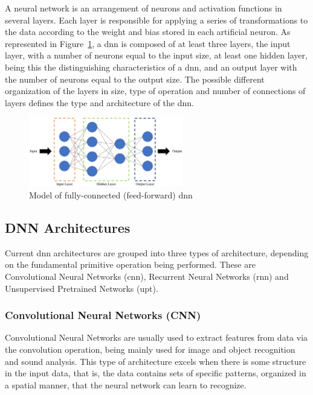 A neural network is an arrangement of neurons and activation functions in several layers. Each layer is responsible for applying a series of transformations to the data according to the weight and bias stored in each artificial neuron. As represented in Figure~\ref{fig:DNNarch}, a \acrshort{dnn} is composed of at least three layers, the input layer, with a number of neurons equal to the input size, at least one hidden layer, being this the distinguishing characteristics of a  \acrshort{dnn}, and an output layer with the number of neurons equal to the output size. The possible different organization of the layers in size, type of operation and number of connections of layers defines the type and architecture of the  \acrshort{dnn}.

\begin{figure}[!htb]
  \centering
  \includegraphics[width=0.6\textwidth]{Figures/Application To Deep Learning/DNNarch.png}
  \caption{Model of fully-connected (feed-forward) \acrshort{dnn}}
  \label{fig:DNNarch}
\end{figure}

\subsection{DNN Architectures}

Current \acrshort{dnn} architectures are grouped into three types of architecture, depending on the fundamental primitive operation being performed. These are Convolutional Neural Networks (\acrshort{cnn}), Recurrent Neural Networks (\acrshort{rnn}) and Unsupervised Pretrained Networks (\acrshort{upt}). 

\subsubsection{Convolutional Neural Networks (CNN)}
Convolutional Neural Networks are usually used to extract features from data via the convolution operation, being mainly used for image and object recognition and sound analysis. This type of architecture excels when there is some structure in the input data, that is, the data contains sets of specific patterns, organized in a spatial manner, that the neural network can learn to recognize.

